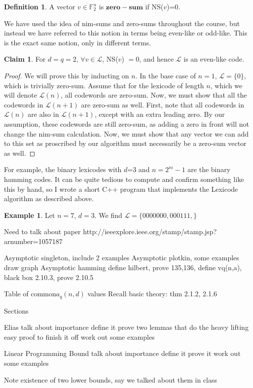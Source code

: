 \documentclass{article}
\numberwithin{theorem}{subsection}
\numberwithin{lemma}{subsection}
\theoremstyle{definition}
\newtheorem{exmp}{Example}
\numberwithin{exmp}{subsection}
\theoremstyle{definition}
\newtheorem{defn}{Definition}
\numberwithin{defn}{subsection}
\theoremstyle{definition}
\newtheorem{claim}{Claim}
\numberwithin{claim}{subsection}
\begin{document}
\begin{defn}
A vector $v\in \mathbb{F}_2^n$ is $\mathbf{zero-sum}$ if NS($v$)=0.
\end{defn}

We have used the idea of nim-sums and zero-sums throughout the course, but instead we have
referred to this notion in terms being even-like or odd-like.  This is the
exact same notion, only in different terms.

\begin{claim}
For $d=q=2$, $\forall v\in \mathcal{L}$, NS($v$) $= 0$, and hence $\mathcal{L}$ is an even-like code.
\end{claim}

\begin{proof}
We will prove this by inducting on $n$.  In the base case of $n=1$,
$\mathcal{L}=\{0\}$, which is trivially zero-sum.  Assume that for the
lexicode of length $n$, which we will denote $\mathcal{L}(n)$, all codewords are zero-sum.  Now, we must show that all
the codewords in $\mathcal{L}(n+1)$ are zero-sum as well.  First, note that all
codewords in $\mathcal{L}(n)$ are also in $\mathcal{L}(n+1)$, except with an
extra leading zero.  By our assumption, these codewords are still zero-sum, as
adding a zero in front will not change the nim-sum calculation.
Now, we must show that any vector we can add to this set as proscribed by our
algorithm must necessarily be a zero-sum vector as well.
\end{proof}


For example, the binary lexicodes with $d$=3 and $n=2^m-1$ are the binary hamming codes.  It can be quite
tedious to compute and confirm something like this by hand, so I wrote a short C++ program that implements the Lexicode algorithm as described above.  

\begin{exmp}
Let $n=7$, $d=3$.  We find $\mathcal{L}= \{0000000,000111,  \}$
\end{exmp}



Need to talk about paper
http://ieeexplore.ieee.org/stamp/stamp.jsp?arnumber=1057187




Asymptotic singleton, include 2 examples
Asymptotic plotkin, some examples
draw graph
Asymptotic hamming
	define hilbert, prove 135,136, define vq(n,a),
	black box 2.10.3, prove 2.10.5


Table of common$a_q(n,d)$ values
Recall basic theory: thm 2.1.2, 2.1.6

Sections


Elias
talk about importance
define it
prove two lemmas that do the heavy lifting
easy proof to finish it off
work out some examples

Linear Programming Bound
talk about importance
define it
prove it
work out some examples


Note existence of two lower bounds, say we talked about them in class
\end{document}
